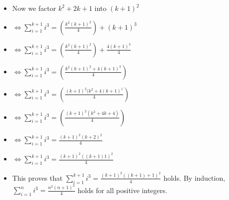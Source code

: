 \begin{enumerate}
\begin{itemize}
    \item Now we factor $k^{2}+2k+1$ into $(k+1)^{2}$
    \item [] {\Large $\Leftrightarrow \sum\limits_{i=1}^{k+1}i^{3}=\left(\frac{k^{2}(k+1)^{2}}{4} \right) + (k+1)^{3}$}
    \item [] {\Large $\Leftrightarrow \sum\limits_{i=1}^{k+1}i^{3}=\left(\frac{k^{2}(k+1)^{2}}{4} \right) + \frac{4(k+1)^{3}}{4}$}
    \item [] {\Large $\Leftrightarrow \sum\limits_{i=1}^{k+1}i^{3}=\left(\frac{k^{2}(k+1)^{2}+4(k+1)^{3}}{4} \right)$}
    \item [] {\Large $\Leftrightarrow \sum\limits_{i=1}^{k+1}i^{3}=\left(\frac{(k+1)^{2}(k^{2}+4(k+1)^{1}}{4} \right)$}
    \item [] {\Large $\Leftrightarrow \sum\limits_{i=1}^{k+1}i^{3}=\left(\frac{(k+1)^{2}(k^{2}+4k+4)}{4} \right)$}
    \item [] {\Large $\Leftrightarrow \sum\limits_{i=1}^{k+1}i^{3}=\frac{(k+1)^{2}(k+2)^{2}}{4}$}
    \item [] {\Large $\Leftrightarrow \sum\limits_{i=1}^{k+1}i^{3}=\frac{(k+1)^{2}((k+1)1)^{2}}{4}$}
    \item This proves that {\Large $\sum\limits_{i=1}^{k+1}i^{3}=\frac{(k+1)^{2}((k+1)+1)^{2}}{4}$} holds. By induction, {\Large $\sum\limits_{i=1}^{n}i^{3}=\frac{n^{2}(n+1)^{2}}{4}$} holds for all positive integers.
    \end{itemize}


\end{enumerate}
